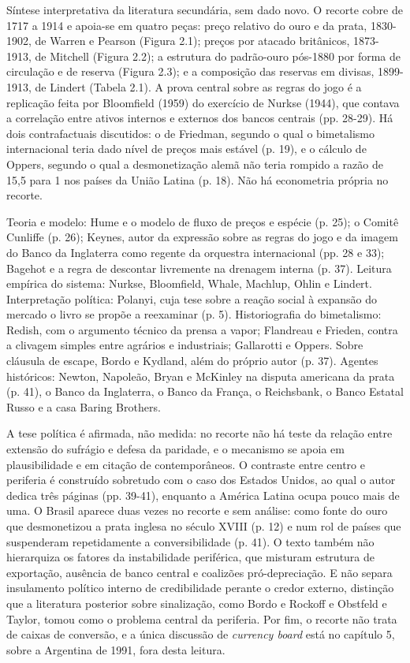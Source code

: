 Síntese interpretativa da literatura secundária, sem dado novo. O recorte cobre
de 1717 a 1914 e apoia-se em quatro peças: preço relativo do ouro e da prata,
1830-1902, de Warren e Pearson (Figura 2.1); preços por atacado britânicos,
1873-1913, de Mitchell (Figura 2.2); a estrutura do padrão-ouro pós-1880 por
forma de circulação e de reserva (Figura 2.3); e a composição das reservas em
divisas, 1899-1913, de Lindert (Tabela 2.1). A prova central sobre as regras do
jogo é a replicação feita por Bloomfield (1959) do exercício de Nurkse (1944),
que contava a correlação entre ativos internos e externos dos bancos centrais
(pp. 28-29). Há dois contrafactuais discutidos: o de Friedman, segundo o qual o
bimetalismo internacional teria dado nível de preços mais estável (p. 19), e o
cálculo de Oppers, segundo o qual a desmonetização alemã não teria rompido a
razão de 15,5 para 1 nos países da União Latina (p. 18). Não há econometria
própria no recorte.

Teoria e modelo: Hume e o modelo de fluxo de preços e espécie (p. 25); o Comitê
Cunliffe (p. 26); Keynes, autor da expressão sobre as regras do jogo e da imagem
do Banco da Inglaterra como regente da orquestra internacional (pp. 28 e 33);
Bagehot e a regra de descontar livremente na drenagem interna (p. 37). Leitura
empírica do sistema: Nurkse, Bloomfield, Whale, Machlup, Ohlin e Lindert.
Interpretação política: Polanyi, cuja tese sobre a reação social à expansão do
mercado o livro se propõe a reexaminar (p. 5). Historiografia do bimetalismo:
Redish, com o argumento técnico da prensa a vapor; Flandreau e Frieden, contra a
clivagem simples entre agrários e industriais; Gallarotti e Oppers. Sobre
cláusula de escape, Bordo e Kydland, além do próprio autor (p. 37). Agentes
históricos: Newton, Napoleão, Bryan e McKinley na disputa americana da prata
(p. 41), o Banco da Inglaterra, o Banco da França, o Reichsbank, o Banco Estatal
Russo e a casa Baring Brothers.

A tese política é afirmada, não medida: no recorte não há teste da relação entre
extensão do sufrágio e defesa da paridade, e o mecanismo se apoia em
plausibilidade e em citação de contemporâneos. O contraste entre centro e
periferia é construído sobretudo com o caso dos Estados Unidos, ao qual o autor
dedica três páginas (pp. 39-41), enquanto a América Latina ocupa pouco mais de
uma. O Brasil aparece duas vezes no recorte e sem análise: como fonte do ouro
que desmonetizou a prata inglesa no século XVIII (p. 12) e num rol de países que
suspenderam repetidamente a conversibilidade (p. 41). O texto também não
hierarquiza os fatores da instabilidade periférica, que misturam estrutura de
exportação, ausência de banco central e coalizões pró-depreciação. E não separa
insulamento político interno de credibilidade perante o credor externo,
distinção que a literatura posterior sobre sinalização, como Bordo e Rockoff e
Obstfeld e Taylor, tomou como o problema central da periferia. Por fim, o
recorte não trata de caixas de conversão, e a única discussão de \emph{currency
board} está no capítulo 5, sobre a Argentina de 1991, fora desta leitura.

